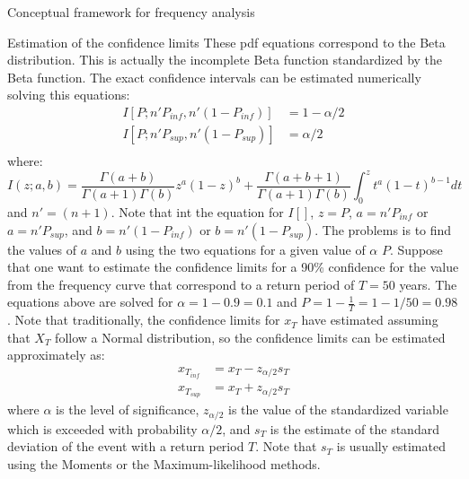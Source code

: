 \documentclass[8pt]{beamer}
\renewcommand{\emph}[1]{\textcolor{myorange}{#1}}
\begin{document}
\begin{frame}{Conceptual framework for  frequency analysis}
        \vspace{-5pt}
    \begin{block}{Estimation of the confidence limits} 
        These \emph{pdf} equations correspond to the \emph{Beta distribution}. This is actually the incomplete Beta function standardized by the Beta function. The exact confidence intervals can be estimated numerically solving this equations:
        \vspace{-8pt}
            \begin{align*}
                I[P; n' P_{inf}, n' (1-P_{inf})] &= 1-\alpha/2 \\
                I[P; n' P_{sup}, n' (1-P_{sup})] &= \alpha/2 \\
            \end{align*}
        \vspace{-8pt}
            where:
        \vspace{-8pt}
            \[
                I(z; a,b) = \frac{\Gamma(a + b)}{\Gamma(a+1) \Gamma (b)} z^a (1-z)^b + \frac{\Gamma(a + b + 1)}{\Gamma(a+1) \Gamma (b)} \int_0^z t^a (1-t)^{b-1} dt
            \]
            and $n' = (n+1)$. Note that int the equation for $I[]$, $z = P$, $a = n' P_{inf}$ or $a = n' P_{sup}$, and $b = n' (1-P_{inf})$ or $b = n' (1-P_{sup})$. The problems is to find the values of $a$ and $b$ using the two equations for a given value of $\alpha$ $P$. Suppose that one want to estimate the confidence limits for a 90\% confidence for the value from the frequency curve that correspond to a return period of $T=50$ years. The equations above are solved for $\alpha = 1-0.9 = 0.1$ and $P = 1 - \frac{1}{T} = 1- 1/50 = 0.98$.
            Note that traditionally, the confidence limits for $x_T$ have estimated assuming that $X_T$ follow a \emph{Normal distribution}, so the confidence limits can be estimated approximately as:
        \vspace{-12pt}
            \begin{align*}
                x_{T_{inf}} &= x_T - z_{\alpha/2} s_T \\
                x_{T_{sup}} &= x_T + z_{\alpha/2} s_T 
            \end{align*}
            where $\alpha$ is the level of significance, $z_{\alpha/2}$ is the value of the standardized variable which is exceeded with probability $\alpha/2$, and $s_T$ is the estimate of the standard deviation of the event with a return period $T$. Note that $s_T$ is usually estimated using the Moments or the Maximum-likelihood methods.
\end{block}

\end{frame}
\end{document}
